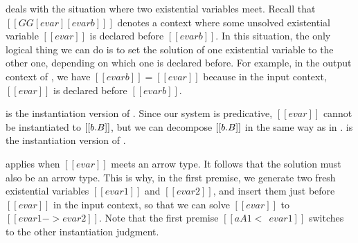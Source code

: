  deals with the situation where two existential variables
meet. Recall that $[[ GG[evar][evarb]  ]]$ denotes a context where some unsolved existential
variable $[[evar]]$ is declared before $[[evarb]]$. In this situation, the only logical
thing we can do is to set the solution of one existential variable to the other
one, depending on which one is declared before. For example, in the output
context of , we have $[[evarb]] = [[evar]]$ because in the input
context, $[[evar]]$ is declared before $[[evarb]]$.

 is the instantiation version of .
Since our system is predicative, $[[evar]]$ cannot be instantiated to $[[\/b. B]]$,
but we can decompose $[[ \/b. B   ]]$ in the same way as in .
 is the instantiation version of .

 applies when $[[evar]]$ meets an arrow type. It
follows that the solution must also be an arrow type.
This is why, in the first premise, we generate two fresh existential variables
$[[evar1]]$ and $[[evar2]]$, and insert them just before $[[evar]]$
in the input context, so that we can solve $[[evar]]$ to $[[ evar1 -> evar2 ]]$.
Note that the first premise $[[ aA1 <~~ evar1 ]]$ switches to the other instantiation judgment.




